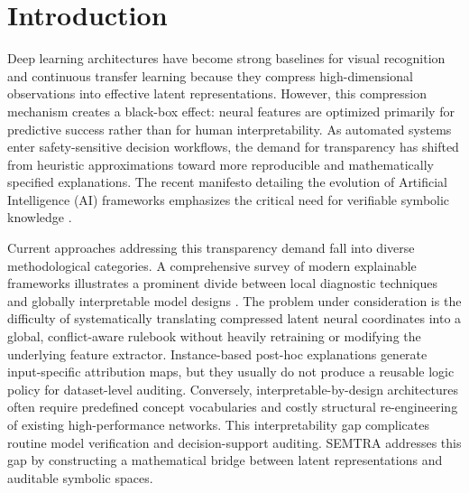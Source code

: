\documentclass[make,article,submit,pdftex,moreauthors]{Definitions/mdpi}
\begin{document}
\section{Introduction}
\label{sec:introduction}

Deep learning architectures have become strong baselines for visual recognition and continuous transfer learning because they compress high-dimensional observations into effective latent representations. However, this compression mechanism creates a black-box effect: neural features are optimized primarily for predictive success rather than for human interpretability. As automated systems enter safety-sensitive decision workflows, the demand for transparency has shifted from heuristic approximations toward more reproducible and mathematically specified explanations. The recent manifesto detailing the evolution of Artificial Intelligence (AI) frameworks emphasizes the critical need for verifiable symbolic knowledge \cite{Longo2024XAI}.

Current approaches addressing this transparency demand fall into diverse methodological categories. A comprehensive survey of modern explainable frameworks illustrates a prominent divide between local diagnostic techniques and globally interpretable model designs \cite{Mersha2024XAISurvey}. The problem under consideration is the difficulty of systematically translating compressed latent neural coordinates into a global, conflict-aware rulebook without heavily retraining or modifying the underlying feature extractor. Instance-based post-hoc explanations generate input-specific attribution maps, but they usually do not produce a reusable logic policy for dataset-level auditing. Conversely, interpretable-by-design architectures often require predefined concept vocabularies and costly structural re-engineering of existing high-performance networks. This interpretability gap complicates routine model verification and decision-support auditing. SEMTRA addresses this gap by constructing a mathematical bridge between latent representations and auditable symbolic spaces.
\end{document}
